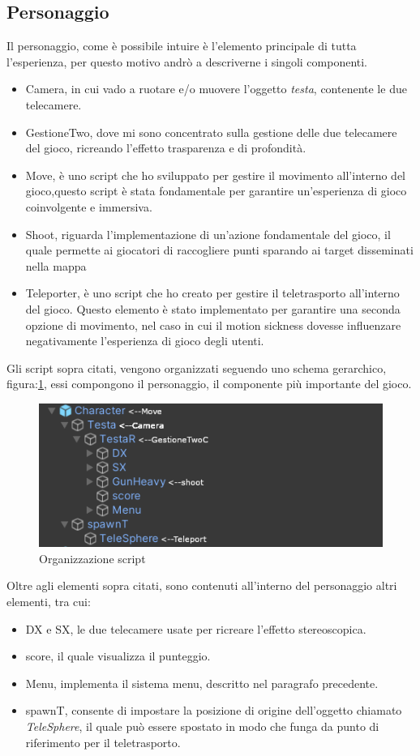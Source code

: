 \documentclass[
a4paper,
cleardoublepage=empty,
headings=twolinechapter,
numbers=autoenddot,
]{scrbook}
\begin{document}
	\subsection{Personaggio}
	Il personaggio, come è possibile intuire è l'elemento principale di tutta l'esperienza, per questo motivo andrò a descriverne i singoli componenti.
	\begin{itemize}
		\item Camera, in cui vado a ruotare e/o muovere l'oggetto \textit{testa}, contenente le due telecamere.
		\item GestioneTwo, dove mi sono concentrato sulla gestione delle due telecamere del gioco, ricreando l'effetto trasparenza e di profondità.
		\item Move, è uno script che ho sviluppato per gestire il movimento all'interno del gioco,questo script è stata fondamentale per garantire un'esperienza di gioco coinvolgente e immersiva.
		\item Shoot, riguarda l'implementazione di un'azione fondamentale del gioco, il quale permette ai giocatori di raccogliere punti sparando ai target disseminati nella mappa
		\item Teleporter, è uno script che ho creato per gestire il teletrasporto all'interno del gioco. Questo elemento è stato implementato per garantire una seconda opzione di movimento, nel caso in cui il motion sickness\cite{mottion_sickness} dovesse influenzare negativamente l'esperienza di gioco degli utenti.
	\end{itemize}
	Gli script sopra citati, vengono organizzati seguendo uno schema gerarchico, figura:\ref{fig:script_character}, essi compongono il personaggio, il componente più importante del gioco.
	\begin{figure}[H]
		\centering
		\includegraphics[width=0.8\linewidth]{image/script_character}
		\caption{Organizzazione script}
		\label{fig:script_character}
	\end{figure}
	Oltre agli elementi sopra citati, sono contenuti all'interno del personaggio altri elementi, tra cui:
	\begin{itemize}
		\item DX e SX, le due telecamere usate per ricreare l'effetto stereoscopica.
		\item score, il quale visualizza il punteggio.
		\item Menu, implementa il sistema menu, descritto nel paragrafo precedente.
		\item spawnT, consente di impostare la posizione di origine dell'oggetto chiamato \textit{TeleSphere}, il quale può essere spostato in modo che funga da punto di riferimento per il teletrasporto.
	\end{itemize}
\end{document}
